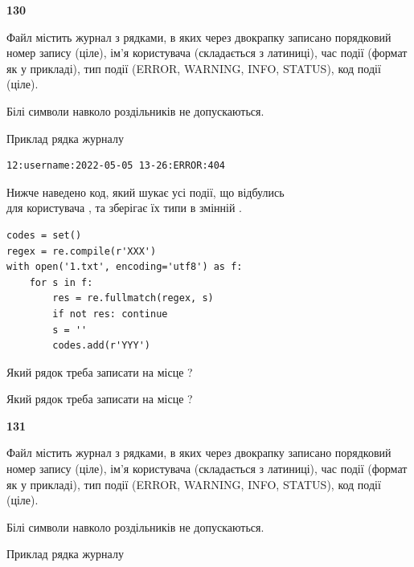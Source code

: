\newpage

{\begin {center}\textbf{ 130}\end {center}}\par
Файл  містить журнал з рядками, в яких через двокрапку записано поряд\-ко\-вий номер запису (ціле), ім'я користувача (складається з латиниці), час події (фор\-мат як у прикладі), тип події (ERROR, WARNING, INFO, STATUS), код події (ціле).

Білі символи навколо роздільників не допускаються.

Приклад рядка журналу



\begin{verbatim}
12:username:2022-05-05 13-26:ERROR:404
\end{verbatim}


Нижче наведено код, який шукає усі події, що відбулись\\ для користувача , та зберігає їх типи в змінній .



\begin{verbatim}
codes = set()
regex = re.compile(r'XXX')
with open('1.txt', encoding='utf8') as f:
    for s in f:
        res = re.fullmatch(regex, s)
        if not res: continue
        s = ''
        codes.add(r'YYY')
\end{verbatim}





Який рядок треба записати на місце  ?\par
\vspace{5mm}


Який рядок треба записати на місце  ?\par


\newpage

{\begin {center}\textbf{ 131}\end {center}}\par
Файл  містить журнал з рядками, в яких через двокрапку записано поряд\-ко\-вий номер запису (ціле), ім'я користувача (складається з латиниці), час події (фор\-мат як у прикладі), тип події (ERROR, WARNING, INFO, STATUS), код події (ціле).

Білі символи навколо роздільників не допускаються.

Приклад рядка журналу



